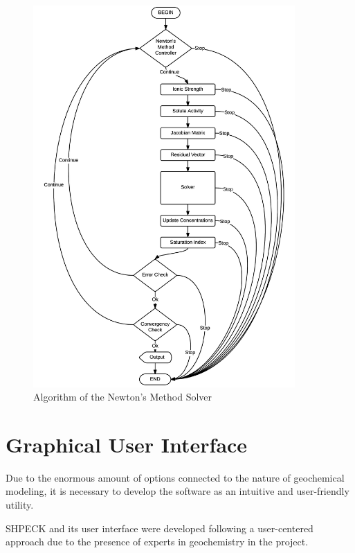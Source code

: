 \begin{figure}[ht!]
\centering
\includegraphics[width=100mm]{figures/Shpeck_algo_newton.png}
\caption{Algorithm of the Newton's Method Solver}
\label{fig:Shpeck-algo-newton}
\end{figure}



\section{Graphical User Interface}
Due to the enormous amount of options connected to the nature of geochemical modeling, it is necessary to develop the software as an intuitive and user-friendly utility. 

SHPECK and its user interface were developed following a user-centered approach due to the presence of experts in geochemistry in the project.  


